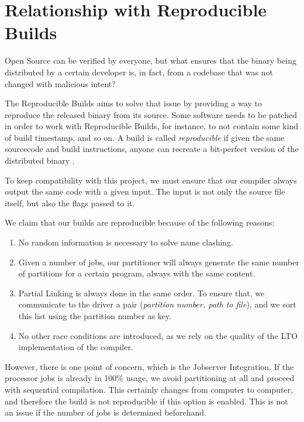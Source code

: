 \documentclass[runningheads]{llncs}
\begin{document}
\section{Relationship with Reproducible Builds}

Open Source can be verified by everyone, but what ensures that the binary
being distributed by a certain developer is, in fact, from a codebase
that was not changed with malicious intent?

The Reproducible Builds aims to solve that issue by providing a way to
reproduce the released binary from its source. Some software needs to
be patched in order to work with Reproducible Builds, for instance,
to not contain some kind of build timestamp, and so on. A build
is called \textit{reproducible} if given the same sourcecode and build
instructions, anyone can recreate a bit-perfect version of the distributed
binary \cite{reproducible_builds}.

To keep compatibility with this project, we must ensure that our compiler
always output the same code with a given input. The input is not only
the source file itself, but also the flags passed to it.

We claim that our builds are reproducible because of the following reasons:

\begin{enumerate}
	\item No random information is necessary to solve name clashing.
	\item Given a number of jobs, our partitioner will always generate
	the same number of partitions for a certain program, always with the same content.
	\item Partial Linking is always done in the same order. To ensure that,
	we communicate to the driver a pair (\textit{partition number, path to file}),
	and we sort this list using the partition number as key.
	\item No other race conditions are introduced, as we rely on the quality of
	the LTO implementation of the compiler.
\end{enumerate}

However, there is one point of concern, which is the Jobserver
Integration.  If the processor jobs is already in 100\% usage, we avoid
partitioning at all and proceed with sequential compilation. This certainly
changes from computer to computer, and therefore the build is not reproducible
if this option is enabled. This is not an issue if the number of jobs is
determined beforehand.
\end{document}
